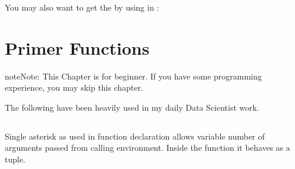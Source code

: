\documentclass[letterpaper,12pt,english]{sphinxmanual}
\begin{document}
You may also want to get the  by using  in :

\begin{sphinxVerbatim}[commandchars=\\\{\}]
      \PYG{p}{[}\PYG{p}{]}
 
      \PYG{p}{[}\PYG{p}{]}
 
      \PYG{p}{[}\PYG{p}{]}
   
\end{sphinxVerbatim}


\chapter{Primer Functions}
\label{\detokenize{primer:primer-functions}}\label{\detokenize{primer:primer}}\label{\detokenize{primer::doc}}
\begin{sphinxadmonition}{note}{Note:}
This Chapter {\hyperref[\detokenize{primer:primer}]{}} is for beginner.  If you have some  programming experience, you may skip this chapter.
\end{sphinxadmonition}

The following  have been heavily used in my daily Data Scientist work.


\section{\sphinxstyleliteralintitle{\sphinxupquote{*}}}
\label{\detokenize{primer:id1}}
Single asterisk as used in function declaration allows variable number of arguments passed from calling environment. Inside the function it behaves as a tuple.

\begin{quote}

\begin{sphinxVerbatim}[commandchars=\\\{\}]
  \PYG{p}{[}\PYG{p}{]}
\end{sphinxVerbatim}
\end{quote}
\end{document}
